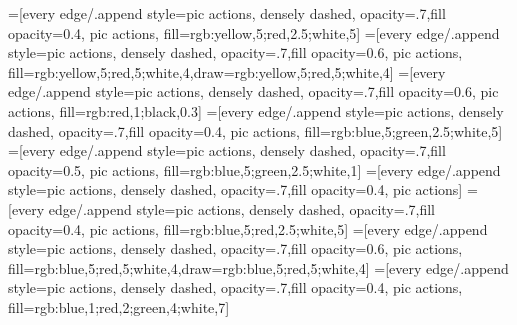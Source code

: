 \usetikzlibrary{quotes,arrows.meta}
\usetikzlibrary{positioning}

\newcommand*{\SecondLastLayerOriginX}{No value}
\def\edgecolor{rgb:blue,4;red,1;green,4;black,3}
\newcommand{\midarrow}{\tikz \draw[-Stealth,line width =0.8mm,draw=\edgecolor] (-0.3,0) -- ++(0.3,0);}

  =[every edge/.append style={pic actions, densely dashed, opacity=.7},fill opacity=0.4, pic actions, fill={rgb:yellow,5;red,2.5;white,5}]
  =[every edge/.append style={pic actions, densely dashed, opacity=.7},fill opacity=0.6, pic actions, fill={rgb:yellow,5;red,5;white,4},draw={rgb:yellow,5;red,5;white,4}]
  =[every edge/.append style={pic actions, densely dashed, opacity=.7},fill opacity=0.6, pic actions, fill={rgb:red,1;black,0.3}]%
=[every edge/.append style={pic actions, densely dashed, opacity=.7},fill opacity=0.4, pic actions, fill={rgb:blue,5;green,2.5;white,5}]
=[every edge/.append style={pic actions, densely dashed, opacity=.7},fill opacity=0.5, pic actions, fill={rgb:blue,5;green,2.5;white,1}]
 =[every edge/.append style={pic actions, densely dashed, opacity=.7},fill opacity=0.4, pic actions]
  =[every edge/.append style={pic actions, densely dashed, opacity=.7},fill opacity=0.4, pic actions, fill={rgb:blue,5;red,2.5;white,5}]
  =[every edge/.append style={pic actions, densely dashed, opacity=.7},fill opacity=0.6, pic actions, fill={rgb:blue,5;red,5;white,4},draw={rgb:blue,5;red,5;white,4}]
  =[every edge/.append style={pic actions, densely dashed, opacity=.7},fill opacity=0.4, pic actions, fill={rgb:blue,1;red,2;green,4;white,7}]

\usepackage{ConvReluPool}
\usepackage{ConvRelu}
\usepackage{Conv}
\usepackage{Deconv}
\usepackage{Up}
\usepackage{Multiply}
\usepackage{Sum}
\usepackage{SigmaSum}
\usepackage{FullyConnected}
\usepackage{FullyConnectedRelu}
\usepackage{DomainTransform}
\usepackage{GenericSequentialLayer}

